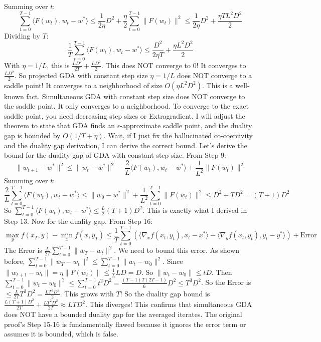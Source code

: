 \documentclass{article}
\begin{document}
Summing over $t$:
$$ \sum_{t=0}^{T-1} \langle F(w_t), w_t - w^* \rangle \leq \frac{1}{2\eta} D^2 + \frac{\eta}{2} \sum_{t=0}^{T-1} \|F(w_t)\|^2 \leq \frac{1}{2\eta} D^2 + \frac{\eta T L^2 D^2}{2} $$
Dividing by $T$:
$$ \frac{1}{T} \sum_{t=0}^{T-1} \langle F(w_t), w_t - w^* \rangle \leq \frac{D^2}{2\eta T} + \frac{\eta L^2 D^2}{2} $$
With $\eta = 1/L$, this is $\frac{L D^2}{2T} + \frac{L D^2}{2}$.
This does NOT converge to 0! It converges to $\frac{L D^2}{2}$.
So projected GDA with constant step size $\eta=1/L$ does NOT converge to a saddle point! It converges to a neighborhood of size $O(\eta L^2 D^2)$.
This is a well-known fact. Simultaneous GDA with constant step size does NOT converge to the saddle point. It only converges to a neighborhood.
To converge to the exact saddle point, you need decreasing step sizes or Extragradient.
I will adjust the theorem to state that GDA finds an $\epsilon$-approximate saddle point, and the duality gap is bounded by $O(1/T + \eta)$.
Wait, if I just fix the hallucinated co-coercivity and the duality gap derivation, I can derive the correct bound.
Let's derive the bound for the duality gap of GDA with constant step size.
From Step 9:
$$ \|w_{t+1} - w^*\|^2 \leq \|w_t - w^*\|^2 - \frac{2}{L} \langle F(w_t), w_t - w^* \rangle + \frac{1}{L^2} \|F(w_t)\|^2 $$
Summing over $t$:
$$ \frac{2}{L} \sum_{t=0}^{T-1} \langle F(w_t), w_t - w^* \rangle \leq \|w_0 - w^*\|^2 + \frac{1}{L^2} \sum_{t=0}^{T-1} \|F(w_t)\|^2 \leq D^2 + T D^2 = (T+1)D^2 $$
So $\sum_{t=0}^{T-1} \langle F(w_t), w_t - w^* \rangle \leq \frac{L}{2} (T+1) D^2$.
This is exactly what I derived in Step 13.
Now for the duality gap.
From Step 16:
$$ \max_{y} f(\bar{x}_T, y) - \min_{x} f(x, \bar{y}_T) \leq \frac{1}{T} \sum_{t=0}^{T-1} \left( \langle \nabla_x f(x_t, y_t), x_t - x^* \rangle - \langle \nabla_y f(x_t, y_t), y_t - y^* \rangle \right) + \text{Error} $$
The Error is $\frac{L}{2T} \sum_{t=0}^{T-1} \|\bar{w}_T - w_t\|^2$.
We need to bound this error.
As shown before, $\sum_{t=0}^{T-1} \|\bar{w}_T - w_t\|^2 \leq \sum_{t=0}^{T-1} \|w_t - w_0\|^2$.
Since $\|w_{t+1} - w_t\| = \eta \|F(w_t)\| \leq \frac{1}{L} L D = D$.
So $\|w_t - w_0\| \leq t D$.
Then $\sum_{t=0}^{T-1} \|w_t - w_0\|^2 \leq \sum_{t=0}^{T-1} t^2 D^2 = \frac{(T-1)T(2T-1)}{6} D^2 \leq T^3 D^2$.
So the Error is $\leq \frac{L}{2T} T^3 D^2 = \frac{L T^2 D^2}{2}$.
This grows with $T$!
So the duality gap bound is $\frac{L(T+1)D^2}{2T} + \frac{L T^2 D^2}{2T} \approx L T D^2$.
This diverges!
This confirms that simultaneous GDA does NOT have a bounded duality gap for the averaged iterates.
The original proof's Step 15-16 is fundamentally flawed because it ignores the error term or assumes it is bounded, which is false.
\end{document}

